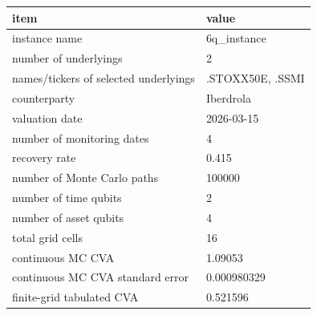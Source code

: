 \begin{tabular}{ll}
\toprule
item & value \\
\midrule
instance name & 6q_instance \\
number of underlyings & 2 \\
names/tickers of selected underlyings & .STOXX50E, .SSMI \\
counterparty & Iberdrola \\
valuation date & 2026-03-15 \\
number of monitoring dates & 4 \\
recovery rate & 0.415 \\
number of Monte Carlo paths & 100000 \\
number of time qubits & 2 \\
number of asset qubits & 4 \\
total grid cells & 16 \\
continuous MC CVA & 1.09053 \\
continuous MC CVA standard error & 0.000980329 \\
finite-grid tabulated CVA & 0.521596 \\
\bottomrule
\end{tabular}
